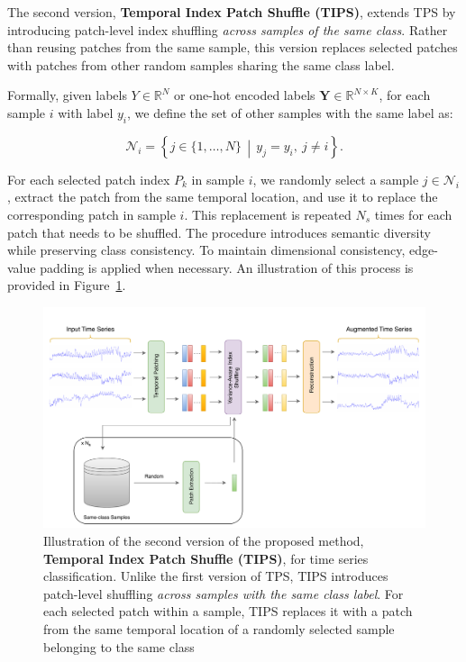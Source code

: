 The second version, \textbf{Temporal Index Patch Shuffle (TIPS)}, extends TPS by introducing patch-level index shuffling \textit{across samples of the same class}. Rather than reusing patches from the same sample, this version replaces selected patches with patches from other random samples sharing the same class label.

Formally, given labels $Y \in \mathbb{R}^{N}$ or one-hot encoded labels $\mathbf{Y} \in \mathbb{R}^{N \times K}$, for each sample $i$ with label $y_i$, we define the set of other samples with the same label as:

\begin{equation}
\mathcal{N}_i = \left\{ j \in \{1, \dots, N\} \,\middle|\, y_j = y_i,\ j \ne i \right\}.
\end{equation}

For each selected patch index $P_k$ in sample $i$, we randomly select a sample $j \in \mathcal{N}_i$, extract the patch from the same temporal location, and use it to replace the corresponding patch in sample $i$. This replacement is repeated $N_s$ times for each patch that needs to be shuffled. The procedure introduces semantic diversity while preserving class consistency. To maintain dimensional consistency, edge-value padding is applied when necessary. An illustration of this process is provided in Figure~\ref{fig:tpstsc2}.



\begin{figure}[h!]
    \centering
\includegraphics[page=1, width=1.0\textwidth, keepaspectratio]{./images/tps_tsc.drawio2.drawio.pdf}
\caption{Illustration of the second version of the proposed method, \textbf{Temporal Index Patch Shuffle (TIPS)}, for time series classification. Unlike the first version of TPS, TIPS introduces patch-level shuffling \emph{across samples with the same class label}. For each selected patch within a sample, TIPS replaces it with a patch from the same temporal location of a randomly selected sample belonging to the same class}

    \label{fig:tpstsc2}
\end{figure}

